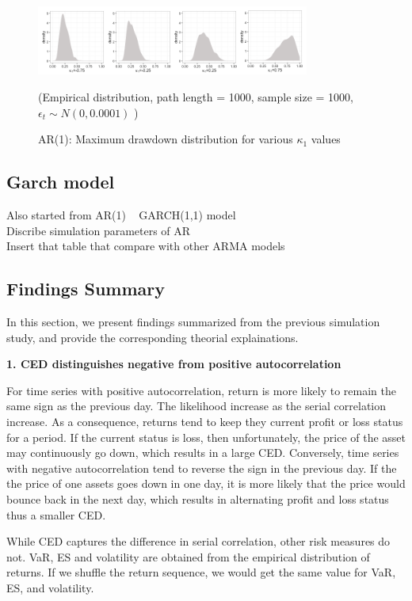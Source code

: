 \documentclass[11pt]{article}
\begin{document}
\begin{figure}[H]
\centering
\includegraphics[width = 0.8\textwidth]{../figures/simulation/AR1_maxDrawdown_dist_re}
\caption{AR(1): Maximum drawdown distribution for various $\kappa_1$ values }
(Empirical distribution, path length = 1000, sample size = 1000, $\epsilon_t \sim N(0, 0.0001)$ )
\label{fig:AR1_maxDrawdown_dist}
\end{figure}

\subsection{Garch model}
Also started from AR(1) ~ GARCH(1,1) model\\
Discribe simulation parameters of AR\\
Insert that table that compare with other ARMA models\\

\subsection{Findings Summary}

In this section, we present findings summarized from the previous simulation study, and provide the corresponding theorial explainations. 

\textbf{1. CED distinguishes negative from positive autocorrelation}

For time series with positive autocorrelation, return is more likely to remain the same sign as the previous day. The likelihood increase as the serial correlation increase. As a consequence, returns tend to keep they current profit or loss status for a period. If the current status is loss, then unfortunately, the price of the asset may continuously go down, which results in a large CED. Conversely, time series with negative autocorrelation tend to reverse the sign in the previous day. If the the price of one assets goes down in one day, it is more likely that the price would bounce back in the next day, which results in alternating profit and loss status thus a smaller CED.

While CED captures the difference in serial correlation, other risk measures do not. VaR, ES and volatility are obtained from the empirical distribution of returns. If we shuffle the return sequence, we would get the same value for VaR, ES, and volatility.
\end{document}
